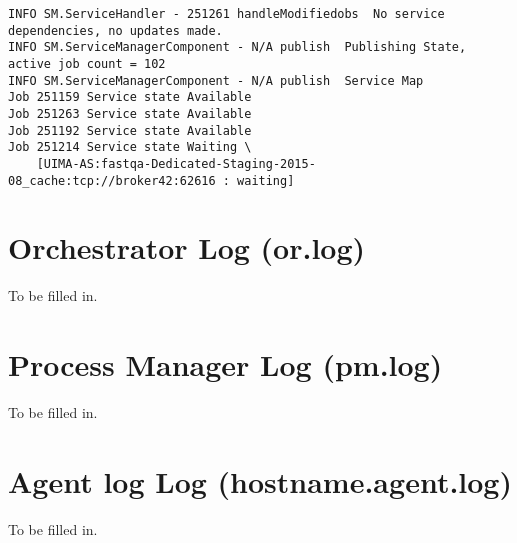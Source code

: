 \begin{verbatim}
INFO SM.ServiceHandler - 251261 handleModifiedobs  No service dependencies, no updates made.
INFO SM.ServiceManagerComponent - N/A publish  Publishing State, active job count = 102
INFO SM.ServiceManagerComponent - N/A publish  Service Map
Job 251159 Service state Available
Job 251263 Service state Available
Job 251192 Service state Available
Job 251214 Service state Waiting \
    [UIMA-AS:fastqa-Dedicated-Staging-2015-08_cache:tcp://broker42:62616 : waiting] 
\end{verbatim}


\section{Orchestrator Log (or.log)}
    To be filled in.

\section{Process Manager Log (pm.log)}
    To be filled in.

\section{Agent log Log (hostname.agent.log)}
    To be filled in.
